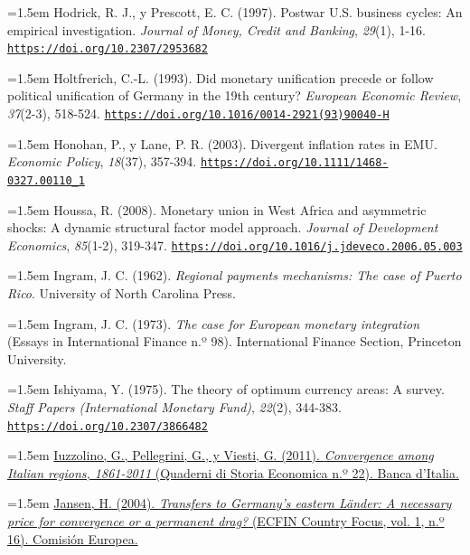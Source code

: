 \documentclass[10pt,a4paper]{article}
\begin{document}
\noindent\hangindent=1.5em Hodrick, R. J., y Prescott, E. C. (1997). Postwar U.S. business cycles: An empirical investigation. \textit{Journal of Money, Credit and Banking}, \textit{29}(1), 1-16. \href{https://doi.org/10.2307/2953682}{\nolinkurl{https://doi.org/10.2307/2953682}}

\noindent\hangindent=1.5em Holtfrerich, C.-L. (1993). Did monetary unification precede or follow political unification of Germany in the 19th century? \textit{European Economic Review}, \textit{37}(2-3), 518-524. \href{https://doi.org/10.1016/0014-2921(93)90040-H}{\nolinkurl{https://doi.org/10.1016/0014-2921(93)90040-H}}

\noindent\hangindent=1.5em Honohan, P., y Lane, P. R. (2003). Divergent inflation rates in EMU. \textit{Economic Policy}, \textit{18}(37), 357-394. \href{https://doi.org/10.1111/1468-0327.00110_1}{\nolinkurl{https://doi.org/10.1111/1468-0327.00110_1}}

\noindent\hangindent=1.5em Houssa, R. (2008). Monetary union in West Africa and asymmetric shocks: A dynamic structural factor model approach. \textit{Journal of Development Economics}, \textit{85}(1-2), 319-347. \href{https://doi.org/10.1016/j.jdeveco.2006.05.003}{\nolinkurl{https://doi.org/10.1016/j.jdeveco.2006.05.003}}

\noindent\hangindent=1.5em Ingram, J. C. (1962). \textit{Regional payments mechanisms: The case of Puerto Rico}. University of North Carolina Press.

\noindent\hangindent=1.5em Ingram, J. C. (1973). \textit{The case for European monetary integration} (Essays in International Finance n.º 98). International Finance Section, Princeton University.

\noindent\hangindent=1.5em Ishiyama, Y. (1975). The theory of optimum currency areas: A survey. \textit{Staff Papers (International Monetary Fund)}, \textit{22}(2), 344-383. \href{https://doi.org/10.2307/3866482}{\nolinkurl{https://doi.org/10.2307/3866482}}

\noindent\hangindent=1.5em \href{https://www.bancaditalia.it/pubblicazioni/quaderni-storia/2011-0022/Quaderno_storia_economica_n_22.pdf}{Iuzzolino, G., Pellegrini, G., y Viesti, G. (2011). \textit{Convergence among Italian regions, 1861-2011} (Quaderni di Storia Economica n.º 22). Banca d'Italia.}

\noindent\hangindent=1.5em \href{https://ec.europa.eu/economy_finance/publications/pages/publication1437_en.pdf}{Jansen, H. (2004). \textit{Transfers to Germany's eastern Länder: A necessary price for convergence or a permanent drag?} (ECFIN Country Focus, vol. 1, n.º 16). Comisión Europea.}
\end{document}
